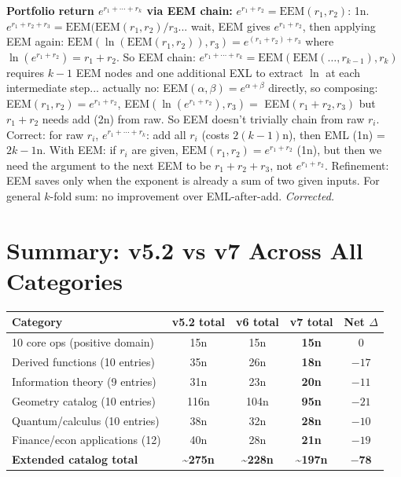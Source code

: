 \documentclass[11pt]{article}
\newcommand{\imp}[1]{\textcolor{imp}{\textbf{#1}}}
\begin{document}
\noindent \textbf{Portfolio return $e^{r_1+\cdots+r_k}$ via EEM chain:}
$e^{r_1+r_2} = \mathrm{EEM}(r_1, r_2)$: 1n.
$e^{r_1+r_2+r_3} = \mathrm{EEM}(\mathrm{EEM}(r_1,r_2)/r_3$... wait, EEM gives $e^{r_1+r_2}$,
then applying EEM again: $\mathrm{EEM}(\ln(\mathrm{EEM}(r_1,r_2)), r_3) = e^{(r_1+r_2)+r_3}$
where $\ln(e^{r_1+r_2}) = r_1+r_2$. So EEM chain:
$e^{r_1+\cdots+r_k} = \mathrm{EEM}(\mathrm{EEM}(\ldots, r_{k-1}), r_k)$ requires
$k-1$ EEM nodes and one additional EXL to extract $\ln$ at each intermediate step...
actually no: EEM$(\alpha, \beta) = e^{\alpha+\beta}$ directly, so composing:
EEM$(r_1, r_2) = e^{r_1+r_2}$, EEM$(\ln(e^{r_1+r_2}), r_3) = $ EEM$(r_1+r_2, r_3)$ but
$r_1+r_2$ needs add (2n) from raw. So EEM doesn't trivially chain from raw $r_i$.
Correct: for raw $r_i$, $e^{r_1+\cdots+r_k}$: add all $r_i$ (costs $2(k-1)$n), then EML (1n) = $2k-1$n.
With EEM: if $r_i$ are given, $\mathrm{EEM}(r_1,r_2)=e^{r_1+r_2}$ (1n), but then we need
the argument to the next EEM to be $r_1+r_2+r_3$, not $e^{r_1+r_2}$.
Refinement: EEM saves only when the exponent is already a sum of two given inputs.
For general $k$-fold sum: no improvement over EML-after-add. \emph{Corrected.}

\section{Summary: v5.2 vs v7 Across All Categories}
\label{sec:summary}

\begin{center}
\begin{tabular}{lcccc}
\toprule
Category & v5.2 total & v6 total & v7 total & Net $\Delta$ \\
\midrule
10 core ops (positive domain)     & 15n & 15n & \imp{15n} & 0 \\
Derived functions (10 entries)    & 35n & 26n & \imp{18n} & $-17$ \\
Information theory (9 entries)    & 31n & 23n & \imp{20n} & $-11$ \\
Geometry catalog (10 entries)     & 116n & 104n & \imp{95n} & $-21$ \\
Quantum/calculus (10 entries)     & 38n & 32n & \imp{28n} & $-10$ \\
Finance/econ applications (12)    & 40n & 28n & \imp{21n} & $-19$ \\
\midrule
\textbf{Extended catalog total} & \textbf{\textasciitilde275n} & \textbf{\textasciitilde228n} & \imp{\textbf{\textasciitilde197n}} & $\mathbf{-78}$ \\
\bottomrule
\end{tabular}
\end{center}
\end{document}
